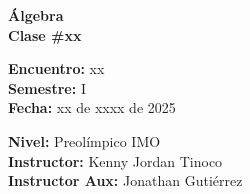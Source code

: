 \begin{center} \textbf
{
    \Large Álgebra \\ \vspace{2mm}Clase \#xx
}
\end{center}

\begin{multicols}{2}
{
    \textbf{Encuentro:} xx\\
    \textbf{Semestre:} I\\
    \textbf{Fecha:} xx de xxxx de 2025\\
    \begin{flushright}
        \textbf{Nivel:} Preolímpico IMO\\
        \textbf{Instructor:} Kenny Jordan Tinoco\\
        \textbf{Instructor Aux:} Jonathan Gutiérrez
    \end{flushright}
}
\end{multicols}

\thispagestyle{first-page-style}